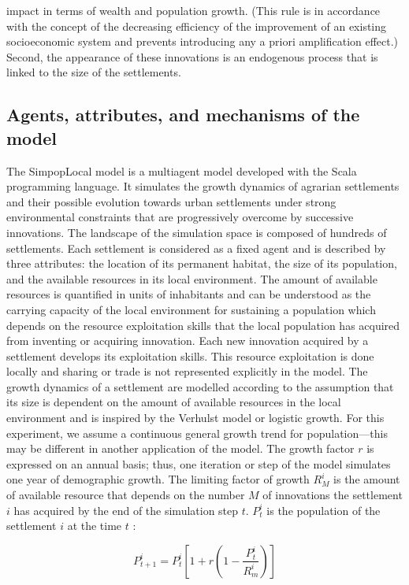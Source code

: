 impact in terms of wealth and population growth. (This rule is in accordance with the concept of the decreasing efficiency of the improvement of an existing socioeconomic system and prevents introducing any a priori amplification effect.) Second, the appearance of these innovations is an endogenous process that is linked to the size of the settlements.


\subsection{Agents, attributes, and mechanisms of the model}
\label{subsec:mechanisms}

The SimpopLocal model is a multiagent model developed with the Scala programming language. It simulates the growth dynamics of agrarian settlements and their possible evolution towards urban settlements under strong environmental constraints that are progressively overcome by successive innovations. The landscape of the simulation space is composed of hundreds of settlements. Each settlement is considered as a fixed agent and is described by three attributes: the location of its permanent habitat, the size of its population, and the available resources in its local environment. The amount of available resources is quantified in units of inhabitants and can be understood as the carrying capacity of the local environment for sustaining a population which depends on the resource exploitation skills that the local population has acquired from inventing or acquiring innovation. Each new innovation acquired by a settlement develops its exploitation skills. This resource exploitation is done locally and sharing or trade is not represented explicitly in the model. The growth dynamics of a settlement are modelled according to the assumption that its size is dependent on the amount of available resources in the local environment and is inspired by the Verhulst model \autocite{Verhulst1845} or logistic growth. For this experiment, we assume a continuous general growth trend for population—this may be different in another application of the model. The growth factor $r$ is expressed on an annual basis; thus, one iteration or step of the model simulates one year of demographic growth. The limiting factor of growth $R^{i}_{M}$ is the amount of available resource that depends on the number $M$ of innovations the settlement $i$ has acquired by the end of the simulation step $t$. $P^{i}_{t}$ is the population of the settlement $i$ at the time $t$ :

\begin{equation}
P^{i}_{t+1} = P^{i}_{t} \left[ 1 + r  \left( 1 -  \frac{P^{i}_{t}} { R^{i}_{m} }\right)\right]
\end{equation}


